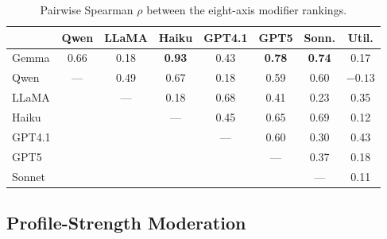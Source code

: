 \documentclass[11pt]{article}
\begin{document}
\begin{table}[h]
\centering
\scriptsize
\setlength{\tabcolsep}{3.5pt}
\begin{tabular}{lccccccc}
\toprule
        & Qwen & LLaMA & Haiku & GPT4.1 & GPT5 & Sonn. & Util. \\
\midrule
Gemma   & 0.66 & 0.18 & \textbf{0.93} & 0.43 & \textbf{0.78} & \textbf{0.74} & 0.17 \\
Qwen    & ---  & 0.49 & 0.67 & 0.18 & 0.59 & 0.60 & $-0.13$ \\
LLaMA   &      & ---  & 0.18 & 0.68 & 0.41 & 0.23 & 0.35 \\
Haiku   &      &      & ---  & 0.45 & 0.65 & 0.69 & 0.12 \\
GPT4.1  &      &      &      & ---  & 0.60 & 0.30 & 0.43 \\
GPT5    &      &      &      &      & ---  & 0.37 & 0.18 \\
Sonnet  &      &      &      &      &      & ---  & 0.11 \\
\bottomrule
\end{tabular}
\caption{Pairwise Spearman $\rho$ between the eight-axis modifier rankings.
}
\label{tab:crossmodel-spearman}
\end{table}

\subsection{Profile-Strength Moderation}


\end{document}
